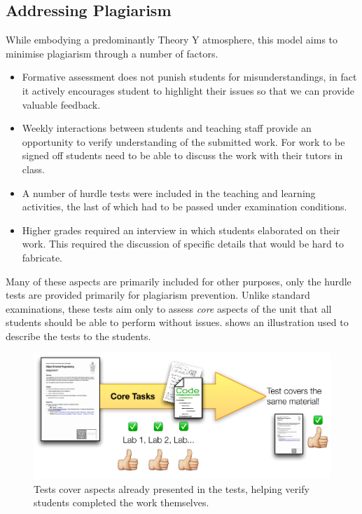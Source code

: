 
\subsection{Addressing Plagiarism} %
\label{sub:addressing_plagiarism}

While embodying a predominantly Theory Y atmosphere, this model aims to minimise plagiarism through a number of factors.
\begin{itemize}[noitemsep,nolistsep]
	\item Formative assessment does not punish students for misunderstandings, in fact it actively encourages student to highlight their issues so that we can provide valuable feedback. 
	\item Weekly interactions between students and teaching staff provide an opportunity to verify understanding of the submitted work. For work to be signed off students need to be able to discuss the work with their tutors in class.
	\item A number of hurdle tests were included in the teaching and learning activities, the last of which had to be passed under examination conditions.
	\item Higher grades required an interview in which students elaborated on their work. This required the discussion of specific details that would be hard to fabricate.
\end{itemize}

Many of these aspects are primarily included for other purposes, only the hurdle tests are provided primarily for plagiarism prevention. Unlike standard examinations, these tests aim only to assess \emph{core} aspects of the unit that all students should be able to perform without issues.  shows an illustration used to describe the tests to the students.

\begin{figure}[htbp]
	\centering
	\includegraphics[width=\textwidth]{Tests}
	\caption{Tests cover aspects already presented in the tests, helping verify students completed the work themselves.}
	\label{fig:tests}
\end{figure}

